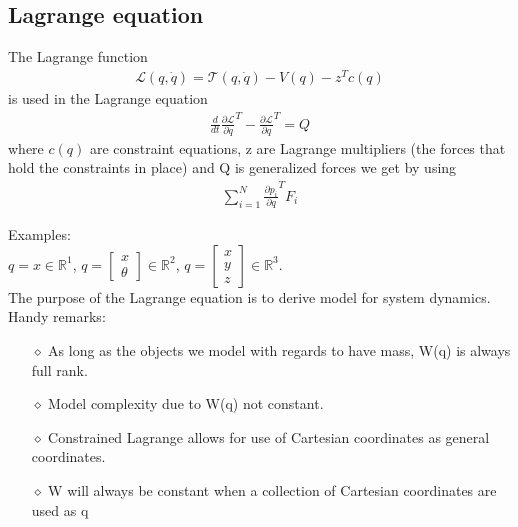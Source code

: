 \subsection{Lagrange equation}
The Lagrange function
\begin{align}
    \mathcal{L}(q,\Dot{q})=\mathcal{T}(q,\Dot{q})-V(q)-z^Tc(q)
\end{align}
is used in the Lagrange equation
\begin{align}
    \frac{d}{dt}\frac{\partial\mathcal{L}}{\partial \dot{q}}^T-\frac{\partial\mathcal{L}}{\partial q}^T=Q
\end{align}
where $c(q)$ are constraint equations, z are Lagrange multipliers (the forces that hold the constraints in place) and Q is generalized forces we get by using 
\begin{align}
    \sum_{i=1}^N\frac{\partial p_i}{\partial q}^T F_i
\end{align}

Examples: \\
$q = x \in \mathbb{R}^1$, 
$q = \begin{bmatrix} x\\ \theta \end{bmatrix} \in \mathbb{R}^2$, 
$q = \begin{bmatrix} x\\ y\\ z \end{bmatrix} \in \mathbb{R}^3$. \\
The purpose of the Lagrange equation is to derive model for system dynamics. Handy remarks:
\begin{itemize}
    \item[$\diamond$] As long as the objects we model with regards to have mass, W(q) is always full rank.
    \item[$\diamond$] Model complexity due to W(q) not constant.
    \item[$\diamond$] Constrained Lagrange allows for use of Cartesian coordinates as general coordinates.
    \item[$\diamond$] W will always be constant when a collection of Cartesian coordinates are used as q
\end{itemize}




